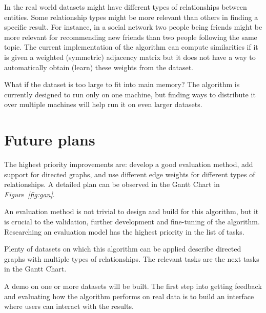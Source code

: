 \documentclass[12pt]{report}
\begin{document}
In the real world datasets might have different types of relationships between
entities. Some relationship types might be more relevant than others in finding
a specific result. For instance, in a social network two people being friends
might be more relevant for recommending new friends than two people following the
same topic. The current implementation of the algorithm can compute similarities
if it is given a weighted (symmetric) adjacency matrix but it does not have a
way to automatically obtain (learn) these weights from the dataset.


What if the dataset is too large to fit into main memory? The algorithm is
currently designed to run only on one machine, but finding ways to distribute it
over multiple machines will help run it on even larger datasets.

%
%
\section{Future plans}
%
The highest priority improvements are: develop a good evaluation method, add support
for directed graphs, and use different edge weights for different types of relationships.
A detailed plan can be observed in the Gantt Chart in \emph{Figure~\ref{fig:gan}}.


An evaluation method is not trivial to design and build for this algorithm, but
it is crucial to the validation, further development and fine-tuning of the algorithm.
Researching an evaluation model has the highest priority in the list of tasks.


Plenty of datasets on which this algorithm can be applied describe directed graphs
with multiple types of relationships. The relevant tasks are the next tasks in
the Gantt Chart.


A demo on one or more datasets will be built. The first step into getting feedback
and evaluating how the algorithm performs on real data is to build an interface
where users can interact with the results.
\end{document}
